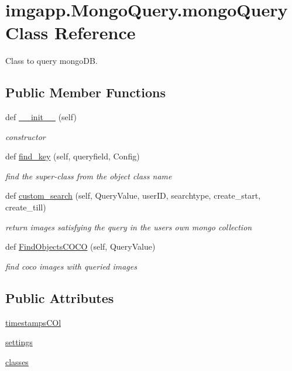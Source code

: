 \hypertarget{classimgapp_1_1MongoQuery_1_1mongoQuery}{}\section{imgapp.\+Mongo\+Query.\+mongo\+Query Class Reference}
\label{classimgapp_1_1MongoQuery_1_1mongoQuery}


Class to query mongo\+DB.  


\subsection*{Public Member Functions}
\begin{DoxyCompactItemize}
\item 
def \hyperlink{classimgapp_1_1MongoQuery_1_1mongoQuery_a479f815a109cb18629f60c824a05ca3d}{\+\_\+\+\_\+init\+\_\+\+\_\+} (self)
\begin{DoxyCompactList}\small\item\em constructor \end{DoxyCompactList}\item 
def \hyperlink{classimgapp_1_1MongoQuery_1_1mongoQuery_a34be40a7a016956c3e956559f800a083}{find\+\_\+key} (self, queryfield, Config)
\begin{DoxyCompactList}\small\item\em find the super-\/class from the object class name \end{DoxyCompactList}\item 
def \hyperlink{classimgapp_1_1MongoQuery_1_1mongoQuery_a475c6a422417c03491d71648dbd97caa}{custom\+\_\+search} (self, Query\+Value, user\+ID, searchtype, create\+\_\+start, create\+\_\+till)
\begin{DoxyCompactList}\small\item\em return images satisfying the query in the user\textquotesingle{}s own mongo collection \end{DoxyCompactList}\item 
def \hyperlink{classimgapp_1_1MongoQuery_1_1mongoQuery_a1936fd6102804ca6e33dd26a3dacab2c}{Find\+Objects\+C\+O\+CO} (self, Query\+Value)
\begin{DoxyCompactList}\small\item\em find coco images with queried images \end{DoxyCompactList}\end{DoxyCompactItemize}
\subsection*{Public Attributes}
\begin{DoxyCompactItemize}
\item 
\hyperlink{classimgapp_1_1MongoQuery_1_1mongoQuery_a6f032a87b0cbdd86d27cb57bdb56d177}{timestamps\+C\+Ol}
\item 
\hyperlink{classimgapp_1_1MongoQuery_1_1mongoQuery_a1c2a13999b3db775d7135512c5c56af5}{settings}
\item 
\hyperlink{classimgapp_1_1MongoQuery_1_1mongoQuery_a841c5742f5a879b1fac81cd85d0bd6d3}{classes}
\end{DoxyCompactItemize}
